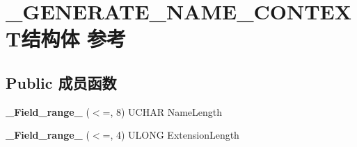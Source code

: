 \hypertarget{struct___g_e_n_e_r_a_t_e___n_a_m_e___c_o_n_t_e_x_t}{}\section{\+\_\+\+G\+E\+N\+E\+R\+A\+T\+E\+\_\+\+N\+A\+M\+E\+\_\+\+C\+O\+N\+T\+E\+X\+T结构体 参考}
\label{struct___g_e_n_e_r_a_t_e___n_a_m_e___c_o_n_t_e_x_t}
\subsection*{Public 成员函数}
\begin{DoxyCompactItemize}
\item 
\mbox{\label{struct___g_e_n_e_r_a_t_e___n_a_m_e___c_o_n_t_e_x_t_adf746bff005bb80e0aa5cf6088cd6000}} 
{\bfseries \+\_\+\+Field\+\_\+range\+\_\+} ($<$=, 8) U\+C\+H\+AR Name\+Length
\item 
\mbox{\label{struct___g_e_n_e_r_a_t_e___n_a_m_e___c_o_n_t_e_x_t_a021b759300205c6f3376c635335a0f0f}} 
{\bfseries \+\_\+\+Field\+\_\+range\+\_\+} ($<$=, 4) U\+L\+O\+NG Extension\+Length
\end{DoxyCompactItemize}
